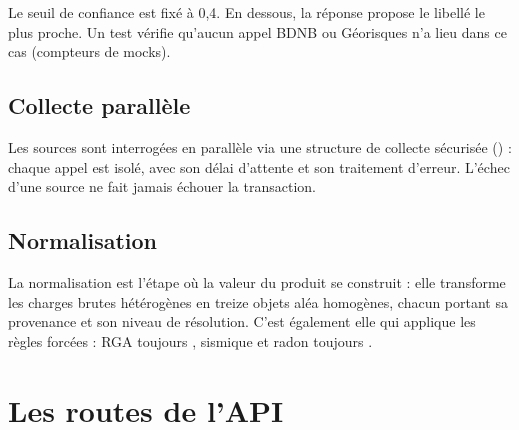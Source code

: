 Le seuil de confiance est fixé à 0,4. En dessous, la réponse propose le libellé
le plus proche. Un test vérifie qu'aucun appel BDNB ou Géorisques n'a lieu dans
ce cas (compteurs de mocks).

\subsection{Collecte parallèle}

Les sources sont interrogées en parallèle via une structure de collecte
sécurisée () : chaque appel est isolé, avec son délai
d'attente et son traitement d'erreur. L'échec d'une source ne fait jamais
échouer la transaction.

\subsection{Normalisation}

La normalisation est l'étape où la valeur du produit se construit : elle
transforme les charges brutes hétérogènes en treize objets aléa homogènes,
chacun portant sa provenance et son niveau de résolution. C'est également elle
qui applique les règles forcées : RGA toujours
, sismique et radon toujours
.

\section{Les routes de l'API}

